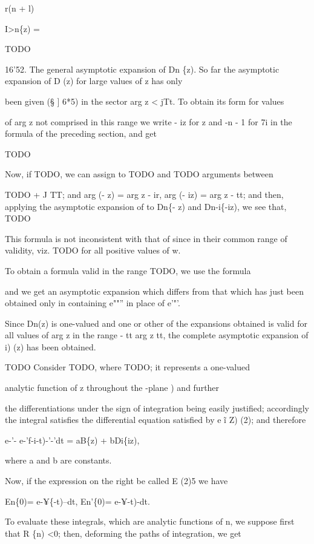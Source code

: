 r(n + l)

I>n\{z) =

TODO

16'52. The general asymptotic expansion of Dn \{z). So far the
asymptotic expansion of D (z) for large values of z has only

been given (§ ] 6*5) in the sector arg z < jTt. To obtain its form for
values

of arg z not comprised in this range we write - iz for z and -n - 1
for 7i in the formula of the preceding section, and get

TODO

Now, if TODO, we can assign to TODO and TODO arguments between

TODO + J TT; and arg (- z) = arg z - ir, arg (- iz) = arg z - tt;
and then, applying the asymptotic expansion of to Dn\{- z) and
Dn-i\{-iz), we see that, TODO

%
%

This formula is not inconsistent with that of since in their
common range of validity, viz. TODO for all positive values of w.

To obtain a formula valid in the range TODO, we use the formula

and we get an asymptotic expansion which differs from that which has
just been obtained only in containing e""'' in place of e'"'.

Since Dn(z) is one-valued and one or other of the expansions obtained
is valid for all values of arg z in the range - tt  arg z tt, the
complete asymptotic expansion of i) (z) has been obtained.


TODO Consider TODO, where TODO; it represents a one-valued

analytic function of z throughout the -plane ) and further

the differentiations under the sign of integration being easily
justified; accordingly the integral satisfies the differential
equation satisfied by e \~ i Z) (2); and therefore

e-'- e-'f-i-t)-'-'dt = aB\{z) + bDi\{iz),

where a and b are constants.

Now, if the expression on the right be called E (2)5 we have

En\{0)= e-¥\{-t)--dt, En'\{0)= e-¥-t)-dt.

To evaluate these integrals, which are analytic functions of n, we
suppose first that R \{n) <0; then, deforming the paths of
integration, we get


